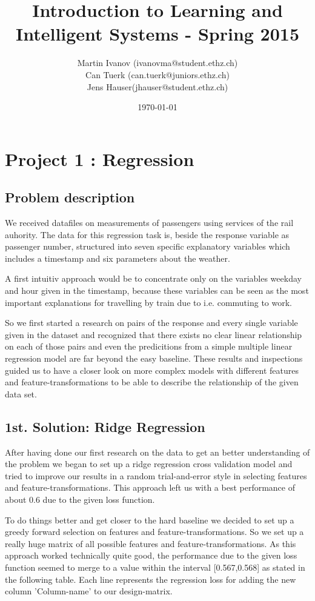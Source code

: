 \documentclass[a4paper, 11pt]{article}
\title{Introduction to Learning and Intelligent Systems - Spring 2015}
\author{Martin Ivanov (ivanovma@student.ethz.ch)\\ Can Tuerk (can.tuerk@juniors.ethz.ch)\\ Jens Hauser(jhauser@student.ethz.ch)\\}
\date{\today}
\begin{document}
\maketitle

\section*{Project 1 : Regression}

\subsection*{Problem description}
We received datafiles on measurements of passengers using services of the rail auhority. The data for this regression task is, beside the response variable as passenger number, structured into seven specific explanatory variables which includes a timestamp and six parameters about the weather.

A first intuitiv approach would be to concentrate only on the variables weekday and hour given in the timestamp, because these variables can be seen as the most important explanations for travelling by train due to i.e. commuting to work.

So we first started a research on pairs of the response and every single variable given in the dataset and recognized that there exists no clear linear relationship on each of those pairs and even the predicitions from a simple multiple linear regression model are far beyond the easy baseline. These results and inspections guided us to have a closer look on more complex models with different features and feature-transformations to be able to describe the relationship of the given data set.

\subsection*{1st. Solution: Ridge Regression}
After having done our first research on the data to get an better understanding of the problem we began to set up a ridge regression cross validation model and tried to improve our results in a random trial-and-error style in selecting features and feature-transformations. This approach left us with a best performance of about 0.6 due to the given loss function.

To do things better and get closer to the hard baseline we decided to set up a greedy forward selection on features and feature-transformations. So we set up a really huge matrix of all possible features and feature-transformations. As this approach worked technically quite good, the performance due to the given loss function seemed to merge to a value within the interval [0.567,0.568] as stated in the following table. Each line represents the regression loss for adding the new column 'Column-name' to our design-matrix.
\end{document}
